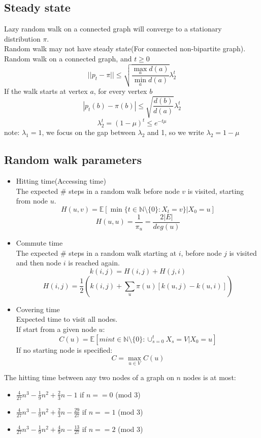\subsection{Steady state}
Lazy random walk on a connected graph will converge to a stationary distribution $\pi$.\\
Random walk may not have steady state(For connected non-bipartite graph).\\
Random walk on a connected graph, and $t\ge 0$ 
\[
    ||p_t-\pi||\le \sqrt{\frac{\max_a d(a)}{\min_a d(a)}}\lambda_2^t
\]
If the walk starts at vertex $a$, for every vertex $b$ 
\[
 |p_t(b)-\pi(b)|\le \sqrt{\frac{d(b)}{d(a)}}\lambda_2^t
\]
\[
\lambda_2^t=(1-\mu)^t\le e^{-t\mu}
\]
note: $\lambda_1=1$, we focus on the gap between $\lambda_2$ and 1, so we write $\lambda_2=1-\mu$

\subsection{Random walk parameters}
\begin{itemize}
    \item Hitting time(Accessing time) \\
    The expected \# steps in a random walk before node $v$ is visited, starting from node $u$.
    \[
    H(u,v)=\mathbb{E}[\min\{ t\in \mathbb{N}\setminus \{0\}:X_t=v\}|X_0=u]
    \]
    \[
    H(u,u)=\frac{1}{\pi_u}=\frac{2|E|}{deg(u)}
    \]
    
    
    \item Commute time \\
    The expected \# steps in a random walk starting at $i$, before node $j$ is visited and then node $i$ is reached again.
    \[
    k(i,j)=H(i,j)+H(j,i)
    \]
    \[
    H(i,j)=\frac{1}{2}(k(i,j)+\sum_u \pi(u)[k(u,j)-k(u,i)])
    \]
    
    \item Covering time \\
    Expected time to visit all nodes.\\
    If start from a given node $u$:
\[
C(u)=\mathbb{E}[min{t\in \mathbb{N}\setminus \{0\}: \cup_{s=0}^t X_s=V}|X_0=u]
\]
If no starting node is specified:
\[
C=\max_{u\in V}C(u)
\]
\end{itemize}

\begin{theorem}
The hitting time between any two nodes of a graph on $n$ nodes is at most:
\begin{itemize}
    \item $\frac{4}{27}n^3-\frac{1}{9}n^2+\frac{2}{3}n -1$ if $n==0$ (mod 3)
    \item $\frac{4}{27}n^3-\frac{1}{9}n^2+\frac{2}{3}n -\frac{29}{27}$ if $n==1$ (mod 3)
    \item $\frac{4}{27}n^3-\frac{1}{9}n^2+\frac{4}{9}n -\frac{13}{27}$ if $n==2$ (mod 3)
\end{itemize}
\end{theorem}

